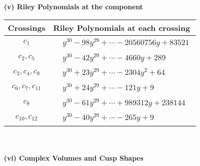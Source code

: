 \documentclass[1p]{elsarticle_modified}
\theoremstyle{definition}
\begin{document}
\newpage\renewcommand{\arraystretch}{1}
\flushleft \textbf{(v) Riley Polynomials at the component}\newline \\
\begin{tabular}{m{50pt}|m{274pt}}
Crossings & \hspace{64pt}Riley Polynomials at each crossing \\
\hline $$\begin{aligned}c_{1}\end{aligned}$$&$\begin{aligned}
&y^{30}-98 y^{29}+\cdots-20560756 y+83521
\end{aligned}$\\
\hline $$\begin{aligned}c_{2},c_{5}\end{aligned}$$&$\begin{aligned}
&y^{30}-42 y^{29}+\cdots-4660 y+289
\end{aligned}$\\
\hline $$\begin{aligned}c_{3},c_{4},c_{9}\end{aligned}$$&$\begin{aligned}
&y^{30}+23 y^{29}+\cdots-2304 y^2+64
\end{aligned}$\\
\hline $$\begin{aligned}c_{6},c_{7},c_{11}\end{aligned}$$&$\begin{aligned}
&y^{30}+24 y^{29}+\cdots-121 y+9
\end{aligned}$\\
\hline $$\begin{aligned}c_{8}\end{aligned}$$&$\begin{aligned}
&y^{30}-61 y^{29}+\cdots+989312 y+238144
\end{aligned}$\\
\hline $$\begin{aligned}c_{10},c_{12}\end{aligned}$$&$\begin{aligned}
&y^{30}-40 y^{29}+\cdots-265 y+9
\end{aligned}$\\
\hline
\end{tabular}\\~\\
\newpage\flushleft \textbf{(vi) Complex Volumes and Cusp Shapes}
\end{document}
